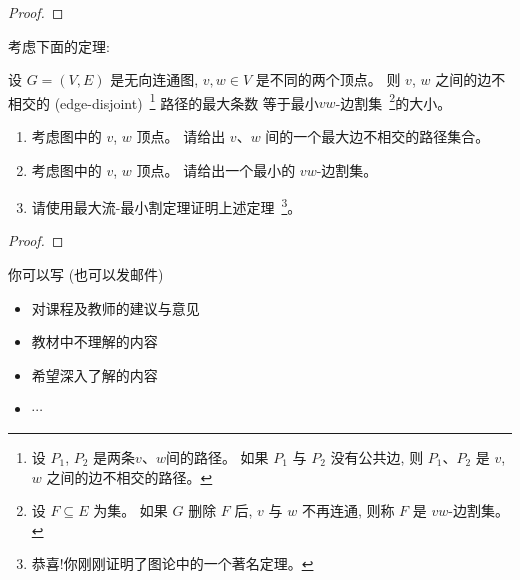 \documentclass[a4paper, justified]{tufte-handout}
\begin{document}
\begin{proof}
\end{proof}

\begin{problem}
  考虑下面的定理:
  \begin{theorem}[不能告诉你名字的某个著名定理]
    设 $G = (V, E)$ 是无向连通图, $v, w \in V$ 是不同的两个顶点。
    则 $v$, $w$ 之间的边不相交的 (edge-disjoint)~\footnote{
      设 $P_{1}$, $P_{2}$ 是两条$v$、$w$间的路径。
      如果 $P_{1}$ 与 $P_{2}$ 没有公共边,
      则 $P_{1}$、$P_{2}$ 是 $v$, $w$ 之间的边不相交的路径。
    } 路径的最大条数
    等于最小$vw$-边割集~\footnote{
      设 $F \subseteq E$ 为集。
      如果 $G$ 删除 $F$ 后, $v$ 与 $w$ 不再连通,
      则称 $F$ 是 $vw$-边割集。
    }的大小。
  \end{theorem}


  \begin{enumerate}[(1)]
    \item 考虑图中的 $v$, $w$ 顶点。
      请给出 $v$、$w$ 间的一个最大边不相交的路径集合。
    \item 考虑图中的 $v$, $w$ 顶点。
      请给出一个最小的 $vw$-边割集。
    \item 请使用最大流-最小割定理证明上述定理~\footnote{恭喜!你刚刚证明了图论中的一个著名定理。}。
  \end{enumerate}
\end{problem}

\begin{proof}
\end{proof}


\beginfb

你可以写 (也可以发邮件)
\begin{itemize}
  \item 对课程及教师的建议与意见
  \item 教材中不理解的内容
  \item 希望深入了解的内容
  \item $\cdots$
\end{itemize}
\end{document}
